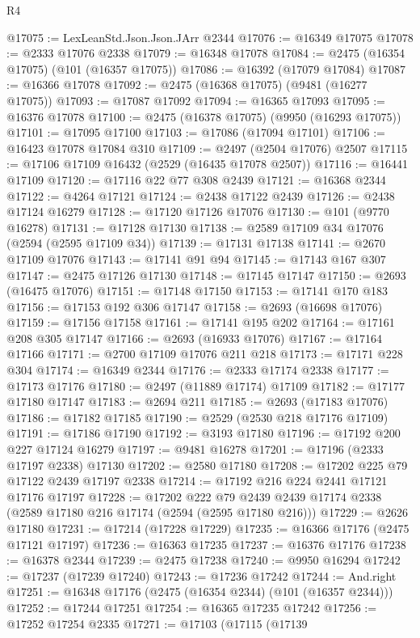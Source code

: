 \begin{lexlean}{R4}
\begin{coremodule}
@17075 := LexLeanStd.Json.Json.JArr @2344
@17076 := @16349 @17075
@17078 := @2333 @17076 @2338
@17079 := @16348 @17078
@17084 := @2475 (@16354 @17075) (@101 (@16357 @17075))
@17086 := @16392 (@17079 @17084)
@17087 := @16366 @17078
@17092 := @2475 (@16368 @17075) (@9481 (@16277 @17075))
@17093 := @17087 @17092
@17094 := @16365 @17093
@17095 := @16376 @17078
@17100 := @2475 (@16378 @17075) (@9950 (@16293 @17075))
@17101 := @17095 @17100
@17103 := @17086 (@17094 @17101)
@17106 := @16423 @17078 @17084 @310
@17109 := @2497 (@2504 @17076) @2507
@17115 := @17106 @17109 @16432 (@2529 (@16435 @17078 @2507))
@17116 := @16441 @17109
@17120 := @17116 @22 @77 @308 @2439
@17121 := @16368 @2344
@17122 := @4264 @17121
@17124 := @2438 @17122 @2439
@17126 := @2438 @17124 @16279
@17128 := @17120 @17126 @17076
@17130 := @101 (@9770 @16278)
@17131 := @17128 @17130
@17138 := @2589 @17109 @34 @17076 (@2594 (@2595 @17109 @34))
@17139 := @17131 @17138
@17141 := @2670 @17109 @17076
@17143 := @17141 @91 @94
@17145 := @17143 @167 @307
@17147 := @2475 @17126 @17130
@17148 := @17145 @17147
@17150 := @2693 (@16475 @17076)
@17151 := @17148 @17150
@17153 := @17141 @170 @183
@17156 := @17153 @192 @306 @17147
@17158 := @2693 (@16698 @17076)
@17159 := @17156 @17158
@17161 := @17141 @195 @202
@17164 := @17161 @208 @305 @17147
@17166 := @2693 (@16933 @17076)
@17167 := @17164 @17166
@17171 := @2700 @17109 @17076 @211 @218
@17173 := @17171 @228 @304
@17174 := @16349 @2344
@17176 := @2333 @17174 @2338
@17177 := @17173 @17176
@17180 := @2497 (@11889 @17174) @17109
@17182 := @17177 @17180 @17147
@17183 := @2694 @211
@17185 := @2693 (@17183 @17076)
@17186 := @17182 @17185
@17190 := @2529 (@2530 @218 @17176 @17109)
@17191 := @17186 @17190
@17192 := @3193 @17180
@17196 := @17192 @200 @227 @17124 @16279
@17197 := @9481 @16278
@17201 := @17196 (@2333 @17197 @2338) @17130
@17202 := @2580 @17180
@17208 := @17202 @225 @79 @17122 @2439 @17197 @2338
@17214 := @17192 @216 @224 @2441 @17121 @17176 @17197
@17228 := @17202
    @222
    @79
    @2439
    @2439
    @17174
    @2338
    (@2589 @17180 @216 @17174 (@2594 (@2595 @17180 @216)))
@17229 := @2626 @17180
@17231 := @17214 (@17228 @17229)
@17235 := @16366 @17176 (@2475 @17121 @17197)
@17236 := @16363 @17235
@17237 := @16376 @17176
@17238 := @16378 @2344
@17239 := @2475 @17238
@17240 := @9950 @16294
@17242 := @17237 (@17239 @17240)
@17243 := @17236 @17242
@17244 := And.right
@17251 := @16348 @17176 (@2475 (@16354 @2344) (@101 (@16357 @2344)))
@17252 := @17244 @17251
@17254 := @16365 @17235 @17242
@17256 := @17252 @17254 @2335
@17271 := @17103
    (@17115
      (@17139

\end{coremodule}
\end{lexlean}
